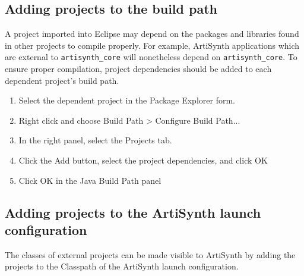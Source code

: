 \subsection{Adding projects to the build path}
\label{AddingProjectsToBuildPath}

A project imported into Eclipse may depend on the packages and
libraries found in other projects to compile properly.  For example,
ArtiSynth applications which are external to {\tt artisynth\_core}
will nonetheless depend on {\tt artisynth\_core}. To ensure proper
compilation, project dependencies should be added to each dependent
project's build path.

\begin{enumerate}

\item Select the dependent project in the {\sf Package Explorer} form.

\item Right click and choose {\sf Build Path > Configure Build Path...} 

\item In the right panel, select the {\sf Projects} tab.

\item Click the {\sf Add} button, select the project dependencies,
      and click {\sf OK}

\item Click {\sf OK} in the Java Build Path panel

\end{enumerate}

\subsection{Adding projects to the ArtiSynth launch configuration}
\label{AddingProjectsToLaunch}

The classes of external projects can be made visible to ArtiSynth by
adding the projects to the Classpath of the ArtiSynth launch
configuration.

